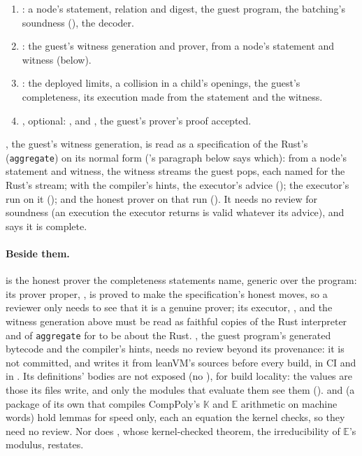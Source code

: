 \documentclass[11pt]{article}
\begin{document}
\begin{enumerate}
\item {}: a node's statement, relation and digest, the guest program, the batching's soundness (), the decoder.
\item {}: the guest's witness generation and prover, from a node's statement and witness (below).
\item {}: the deployed limits, a collision in a child's openings, the guest's completeness, its execution made from the statement and the witness.
\item {}, optional: , and , the guest's prover's proof accepted.
\end{enumerate}
, the guest's witness generation, is read as a specification of the Rust's (\texttt{aggregate}) on its normal form ('s paragraph below says which): from a node's statement and witness, the witness streams the guest pops, each named for the Rust's stream; with the compiler's hints, the executor's advice (); the executor's run on it (); and the honest prover on that run (). It needs no review for soundness (an execution the executor returns is valid whatever its advice), and  says it is complete.
\paragraph{Beside them.}  is the honest prover the completeness statements name, generic over the program: its prover proper, , is proved to make the specification's honest moves, so a reviewer only needs to see that it is a genuine prover; its executor, , and the witness generation above must be read as faithful copies of the Rust interpreter and of \texttt{aggregate} for  to be about the Rust. , the guest program's generated bytecode and the compiler's hints, needs no review beyond its provenance: it is not committed, and  writes it from leanVM's sources before every build, in CI and in . Its definitions' bodies are not exposed (no ), for build locality: the values are those its files write, and only the modules that evaluate them see them ().  and  (a package of its own that compiles CompPoly's $\mathbb{K}$ and $\mathbb{E}$ arithmetic on machine words) hold  lemmas for speed only, each an equation the kernel checks, so they need no review. Nor does , whose kernel-checked theorem, the irreducibility of $\mathbb{E}$'s modulus,  restates.
\end{document}
